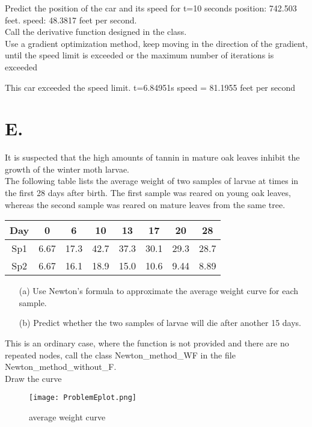 \documentclass[a4paper]{article}
\begin{document}
    Predict the position of the car and its speed for t=10 seconds
    position: 742.503 feet. speed: 48.3817 feet per second. \\
    Call the derivative function designed in the class.\\
    
    Use a gradient optimization method, keep moving in the direction of the gradient, until the speed limit is exceeded or the maximum number of iterations is exceeded
    
    This car exceeded the speed limit.
    t=6.84951s speed = 81.1955 feet per second
    
    
    \section*{E.}
    It is suspected that the high amounts of tannin in mature oak leaves inhibit the growth of the winter moth larvae.\\
    
    The following table lists the average weight of two samples of larvae at times in the first 28 days after birth. The first sample was reared on young oak leaves, whereas the second sample was reared on mature leaves from the same tree.
    
    \begin{table}[H]
        \centering
        \begin{tabular}{@{}cccccccc@{}}
            \toprule
            Day & 0 & 6 & 10 & 13 & 17 & 20 & 28 \\ \midrule
            Sp1 & 6.67 & 17.3 & 42.7 & 37.3 & 30.1 & 29.3 & 28.7 \\
            Sp2 & 6.67 & 16.1 & 18.9 & 15.0 & 10.6 & 9.44 & 8.89 \\ \bottomrule
        \end{tabular}
    \end{table}
    
    \begin{enumerate}
        \item[(a)] Use Newton's formula to approximate the average weight curve for each sample.
        \item[(b)] Predict whether the two samples of larvae will die after another 15 days.
    \end{enumerate}
    
    This is an ordinary case, where the function is not provided and there are no repeated nodes, call the class Newton\_method\_WF in the file Newton\_method\_without\_F. \\
    Draw the curve \\
    \begin{figure}[H]
        \centering 
        \texttt{[image: ProblemEplot.png]} 
        \caption{average weight curve} 
    \end{figure}
    
\end{document}
